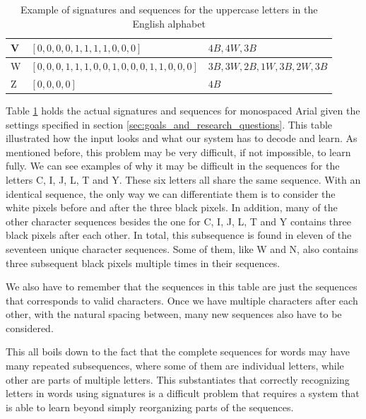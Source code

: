 \begin{table}[H]
\begin{tabular}{|l|l|l|}
        V                     & $[0, 0, 0, 0, 1, 1, 1, 1, 0, 0, 0]$                   & $4B, 4W, 3B$                 \\ \hline
        W                     & $[0, 0, 0, 1, 1, 1, 0, 0, 1, 0, 0, 0, 1, 1, 0, 0, 0]$ & $3B, 3W, 2B, 1W, 3B, 2W, 3B$ \\ \hline
        Z                     & $[0, 0, 0, 0]$                                        & $4B$                         \\ \hline
    \end{tabular}
    \label{table:signature_sequence_example}
    \caption{Example of signatures and sequences for the uppercase letters in the English alphabet}
\end{table}

Table \ref{table:signature_sequence_example} holds the actual signatures and sequences for monospaced Arial given the settings specified in section \ref{sec:goals_and_research_questions}. This table illustrated how the input looks and what our system has to decode and learn. As mentioned before, this problem may be very difficult, if not impossible, to learn fully. We can see examples of why it may be difficult in the sequences for the letters C, I, J, L, T and Y. These six letters all share the same sequence. With an identical sequence, the only way we can differentiate them is to consider the white pixels before and after the three black pixels.  In addition, many of the other character sequences besides the one for C, I, J, L, T and Y contains three black pixels after each other. In total, this subsequence is found in eleven of the seventeen unique character sequences. Some of them, like W and N, also contains three subsequent black pixels multiple times in their sequences. 

We also have to remember that the sequences in this table are just the sequences that corresponds to valid characters. Once we have multiple characters after each other, with the natural spacing between, many new sequences also have to be considered. 

This all boils down to the fact that the complete sequences for words may have many repeated subsequences, where some of them are individual letters, while other are parts of multiple letters. This substantiates that correctly recognizing letters in words using signatures is a difficult problem that requires a system that is able to learn beyond simply reorganizing parts of the sequences.